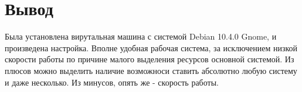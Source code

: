 \documentclass[a4paper,14pt]{extarticle}
\begin{document}
\newpage

\section{Вывод}

Была установлена вирутальная машина с системой Debian 10.4.0 Gnome, и произведена настройка.
Вполне удобная рабочая система, за исключением низкой скорости работы по причине малого выделения ресурсов основной системой. Из плюсов можно выделить наличие возможноси ставить абсолютно любую систему и даже несколько. Из минусов, опять же - скорость работы.
\end{document}
